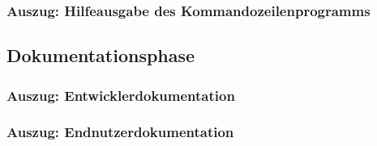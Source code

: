 \subsubsection{Auszug: Hilfeausgabe des Kommandozeilenprogramms}

\subsection{Dokumentationsphase}
\subsubsection{Auszug: Entwicklerdokumentation}


\subsubsection{Auszug: Endnutzerdokumentation}
